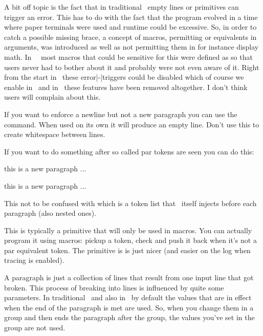 A bit off topic is the fact that in traditional \TEX\ empty lines or \type {\par}
primitives can trigger an error. This has to do with the fact that the program
evolved in a time where paper terminals were used and runtime could be excessive.
So, in order to catch a possible missing brace, a concept of \type {\long}
macros, permitting \type {\par} or equivalents in arguments, was introduced as
well as not permitting them in for instance display math. In \CONTEXT\ \MKII\
most macros that could be sensitive for this were defined as \type {\long} so
that users never had to bother about it and probably were not even aware of it.
Right from the start in \LUATEX\ these error|-|triggers could be disabled which
of course we enable in \CONTEXT\ and in \LUAMETATEX\ these features have been
removed altogether. I don't think users will complain about this.

If you want to enforce a newline but not a new paragraph you can use the \type
{\crlf} command. When used on its own it will produce an empty line. Don't use
this to create whitespace between lines.

If you want to do something after so called par tokens are seen you can do this:

\startbuffer
\def\foo{{\bf >>>> }}
\expandafterpars\foo

this is a new paragraph ...

\expandafterpars\foo
\par\par\par\par
this is a new paragraph ...
\stopbuffer

\typebuffer[option=TEX]

This not to be confused with \type {\everypar} which is a token list that \TEX\
itself injects before each paragraph (also nested ones).

\getbuffer

This is typically a primitive that will only be used in macros. You can actually
program it using macros: pickup a token, check and push it back when it's not a
par equivalent token. The primitive is is just nicer (and easier on the log when
tracing is enabled).

\stopsection

\startsection[title=Properties]

A paragraph is just a collection of lines that result from one input line that
got broken. This process of breaking into lines is influenced by quite some
parameters. In traditional \TEX\ and also in \LUAMETATEX\ by default the values
that are in effect when the end of the paragraph is met are used. So, when you
change them in a group and then ends the paragraph after the group, the values
you've set in the group are not used.

